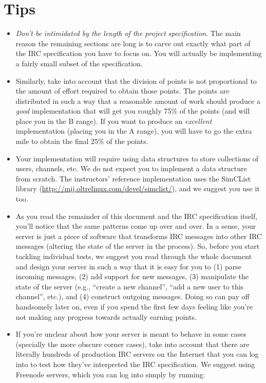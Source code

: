 \documentclass[10pt]{article}
\begin{document}
\pagebreak

\section{Tips}
\label{sec:tips}

\begin{itemize}
\item \emph{Don't be intimidated by the length of the project specification}. The main reason the remaining sections are long is to carve out exactly what part of the IRC specification you have to focus on. You will actually be implementing a fairly small subset of the specification.
\item Similarly, take into account that the division of points is not proportional to the amount of effort required to obtain those points. The points are distributed in such a way that a reasonable amount of work should produce a \emph{good} implementation that will get you roughly 75\% of the points (and will place you in the B range). If you want to produce an \emph{excellent} implementation (placing you in the A range), you will have to go the extra mile to obtain the final 25\% of the points.
\item Your implementation will require using data structures to store collections of users, channels, etc. We do not expect you to implement a data structure from scratch. The instructors' reference implementation uses the SimCList library (\url{http://mij.oltrelinux.com/devel/simclist/}), and we suggest you use it too.
\item As you read the remainder of this document and the IRC specification itself, you'll notice that the same patterns come up over and over. In a sense, your server is just a piece of software that transforms IRC messages into other IRC messages (altering the state of the server in the process). So, before you start tackling individual tests, we suggest you read through the whole document and design your server in such a way that it is easy for you to (1) parse incoming messages, (2) add support for new messages, (3) manipulate the state of the server (e.g., ``create a new channel'', ``add a new user to this channel'', etc.), and (4) construct outgoing messages. Doing so can pay off handsomely later on, even if you spend the first few days feeling like you're not making any progress towards actually earning points.
\item If you're unclear about how your server is meant to behave in some cases (specially the more obscure corner cases), take into account that there are literally hundreds of production IRC servers on the Internet that you can log into to test how they've interpreted the IRC specification. We suggest using Freenode servers, which you can log into simply by running:


\end{itemize}
\end{document}
